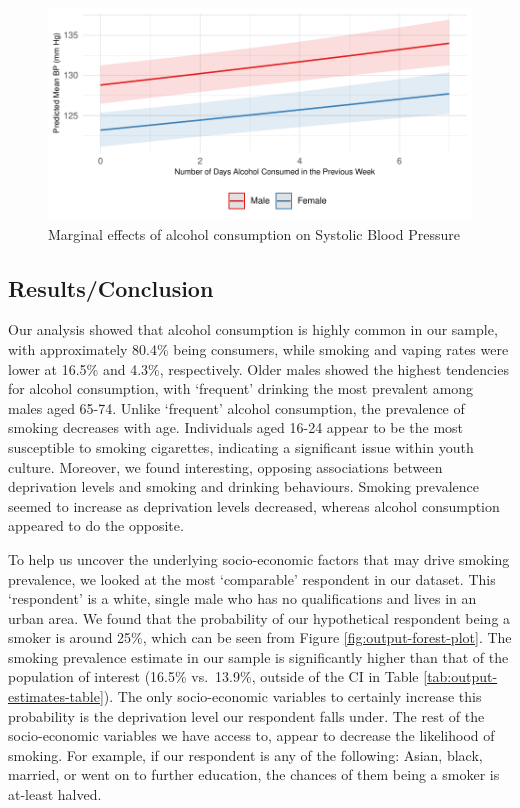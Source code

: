 \documentclass[
  11pt,
  twocolumn]{article}
\begin{document}
\begin{figure}[H]
\includegraphics{Coursework_files/figure-latex/output-effect-plots-alc-1} \caption{Marginal effects of alcohol consumption on Systolic Blood Pressure}\label{fig:output-effect-plots-alc}
\end{figure}

\hypertarget{resultsconclusion}{%
\subsection{Results/Conclusion}\label{resultsconclusion}}

Our analysis showed that alcohol consumption is highly common in our
sample, with approximately 80.4\% being consumers, while smoking and
vaping rates were lower at 16.5\% and 4.3\%, respectively. Older males
showed the highest tendencies for alcohol consumption, with `frequent'
drinking the most prevalent among males aged 65-74. Unlike `frequent'
alcohol consumption, the prevalence of smoking decreases with age.
Individuals aged 16-24 appear to be the most susceptible to smoking
cigarettes, indicating a significant issue within youth culture.
Moreover, we found interesting, opposing associations between
deprivation levels and smoking and drinking behaviours. Smoking
prevalence seemed to increase as deprivation levels decreased, whereas
alcohol consumption appeared to do the opposite.

To help us uncover the underlying socio-economic factors that may drive
smoking prevalence, we looked at the most `comparable' respondent in our
dataset. This `respondent' is a white, single male who has no
qualifications and lives in an urban area. We found that the probability
of our hypothetical respondent being a smoker is around 25\%, which can
be seen from Figure \ref{fig:output-forest-plot}. The smoking prevalence
estimate in our sample is significantly higher than that of the
population of interest (16.5\% vs.~13.9\%, outside of the CI in Table
\ref{tab:output-estimates-table}). The only socio-economic variables to
certainly increase this probability is the deprivation level our
respondent falls under. The rest of the socio-economic variables we have
access to, appear to decrease the likelihood of smoking. For example, if
our respondent is any of the following: Asian, black, married, or went
on to further education, the chances of them being a smoker is at-least
halved.
\end{document}
